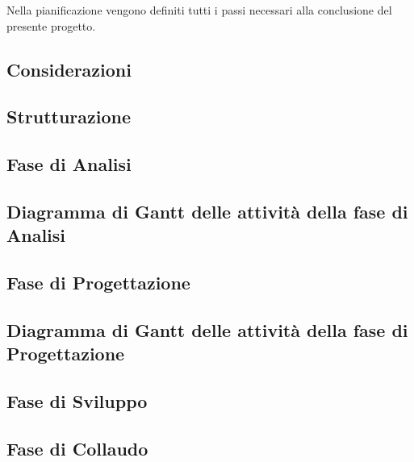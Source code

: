 Nella pianificazione vengono definiti tutti i passi necessari alla conclusione del presente progetto.

\subsection{Considerazioni}\label{sec:Considerazioni}


\subsection{Strutturazione}\label{sec:Strutturazione}

\newpage
\subsection{Fase di Analisi}\label{sec:Periodo 1 Analisi}

\newpage
\subsection{Diagramma di Gantt delle attività della fase di Analisi}\label{sec:Gant Analisi}


\subsection{Fase di Progettazione}\label{Progettazione}

\newpage
\subsection{Diagramma di Gantt delle attività della fase di Progettazione}
\label{sec:Gant Progettazione}

    
\subsection{Fase di Sviluppo}\label{sec:Sviluppo}

    
\subsection{Fase di Collaudo}\label{sec:Collaudo}
